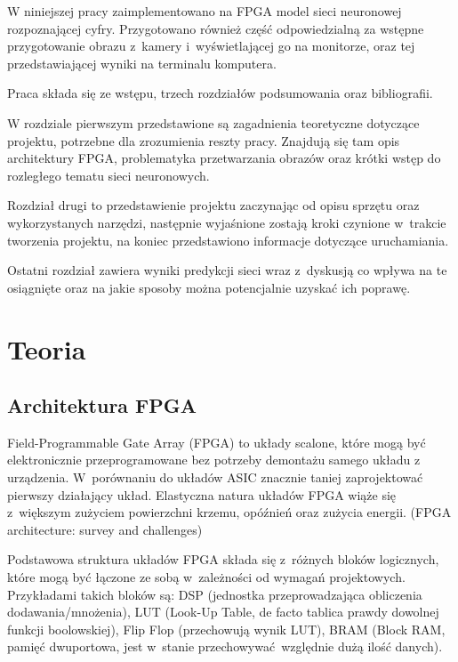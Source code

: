 \documentclass[12pt, oneside, a4paper]{article}
\begin{document}
W niniejszej pracy zaimplementowano na FPGA model sieci neuronowej rozpoznającej
cyfry. Przygotowano również część odpowiedzialną za wstępne przygotowanie
obrazu z~kamery i~wyświetlającej go na monitorze, oraz tej przedstawiającej
wyniki na terminalu komputera.

Praca składa się ze wstępu, trzech rozdziałów podsumowania oraz bibliografii.

W rozdziale pierwszym przedstawione są zagadnienia teoretyczne dotyczące
projektu, potrzebne dla zrozumienia reszty pracy. Znajdują się tam opis
architektury FPGA, problematyka przetwarzania obrazów oraz krótki wstęp
do rozległego tematu sieci neuronowych.

Rozdział drugi to przedstawienie projektu zaczynając od opisu
sprzętu oraz wykorzystanych narzędzi, następnie wyjaśnione zostają kroki
czynione w~trakcie tworzenia projektu, na koniec przedstawiono informacje
dotyczące uruchamiania.

Ostatni rozdział zawiera wyniki predykcji sieci wraz z~dyskusją co wpływa
na te osiągnięte oraz na jakie sposoby można potencjalnie uzyskać ich poprawę.

\restoregeometry{}

\newpage
\section{Teoria}\label{sec:Teoria}
\subsection{Architektura FPGA}\label{sec:Architektura FPGA}
Field-Programmable Gate Array (FPGA) to układy scalone, które mogą być
elektronicznie przeprogramowane bez potrzeby demontażu samego układu
z urządzenia. W~porównaniu do układów ASIC znacznie taniej zaprojektować
pierwszy działający układ. Elastyczna natura układów FPGA wiąże się z~większym
zużyciem powierzchni krzemu, opóźnień oraz zużycia energii.
 (FPGA architecture: survey and challenges)

Podstawowa struktura układów FPGA składa się z~różnych bloków logicznych,
które mogą być łączone ze sobą w~zależności od wymagań projektowych.
Przykładami takich bloków są:
DSP (jednostka przeprowadzająca obliczenia dodawania/mnożenia),
LUT (Look-Up Table, de facto tablica prawdy dowolnej funkcji boolowskiej),
Flip Flop (przechowują wynik LUT), BRAM (Block RAM, pamięć dwuportowa,
jest w~stanie przechowywać względnie dużą ilość danych).
\end{document}
